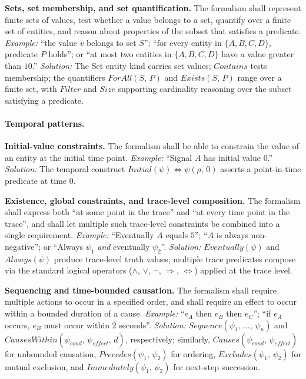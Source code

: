 \textbf{Sets, set membership, and set quantification.} The formalism shall represent finite sets of values, test whether a value belongs to a set, quantify over a finite set of entities, and reason about properties of the subset that satisfies a predicate. \textit{Example:} ``the value $v$ belongs to set $S$''; ``for every entity in $\{A, B, C, D\}$, predicate $P$ holds''; or ``at most two entities in $\{A, B, C, D\}$ have a value greater than $10$.'' \textit{Solution:} The Set entity kind carries set values; $\mathit{Contains}$ tests membership; the quantifiers $\mathit{ForAll}(S,\, P)$ and $\mathit{Exists}(S,\, P)$ range over a finite set, with $\mathit{Filter}$ and $\mathit{Size}$ supporting cardinality reasoning over the subset satisfying a predicate.

\paragraph{Temporal patterns.}

\textbf{Initial-value constraints.} The formalism shall be able to constrain the value of an entity at the initial time point. \textit{Example:} ``Signal $A$ has initial value $0$.'' \textit{Solution:} The temporal construct $\mathit{Initial}(\psi) \Leftrightarrow \psi(\rho,\, 0)$ asserts a point-in-time predicate at time $0$.

\textbf{Existence, global constraints, and trace-level composition.} The formalism shall express both ``at some point in the trace'' and ``at every time point in the trace'', and shall let multiple such trace-level constraints be combined into a single requirement. \textit{Example:} ``Eventually $A$ equals $5$''; ``$A$ is always non-negative''; or ``Always $\psi_1$ \emph{and} eventually $\psi_2$''. \textit{Solution:} $\mathit{Eventually}(\psi)$ and $\mathit{Always}(\psi)$ produce trace-level truth values; multiple trace predicates compose via the standard logical operators ($\land$, $\lor$, $\lnot$, $\Rightarrow$, $\Leftrightarrow$) applied at the trace level.

\textbf{Sequencing and time-bounded causation.} The formalism shall require multiple actions to occur in a specified order, and shall require an effect to occur within a bounded duration of a cause. \textit{Example:} ``$e_A$ then $e_B$ then $e_C$''; ``if $e_A$ occurs, $e_B$ must occur within $2$ seconds''. \textit{Solution:} $\mathit{Sequence}(\psi_1,\, \ldots,\, \psi_n)$ and $\mathit{CausesWithin}(\psi_{\mathit{cond}},\, \psi_{\mathit{effect}},\, d)$, respectively; similarly, $\mathit{Causes}(\psi_{\mathit{cond}},\, \psi_{\mathit{effect}})$ for unbounded causation, $\mathit{Precedes}(\psi_1,\, \psi_2)$ for ordering, $\mathit{Excludes}(\psi_1,\, \psi_2)$ for mutual exclusion, and $\mathit{Immediately}(\psi_1,\, \psi_2)$ for next-step succession.

